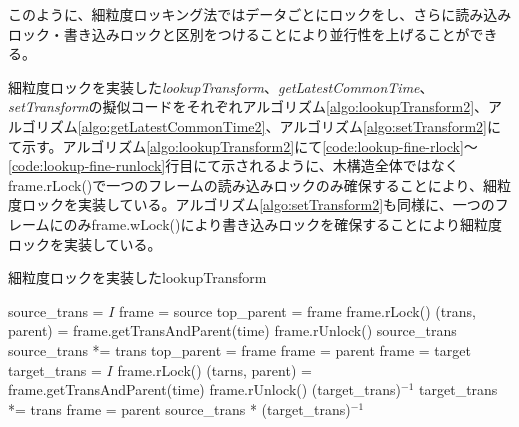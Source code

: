 \documentclass[a4paper]{jreport}	%
\begin{document}
このように、細粒度ロッキング法ではデータごとにロックをし、さらに読み込みロック・書き込みロックと区別をつけることにより並行性を上げることができる。

細粒度ロックを実装した\textit{lookupTransform}、\textit{getLatestCommonTime}、\textit{setTransform}の擬似コードをそれぞれアルゴリズム\ref{algo:lookupTransform2}、アルゴリズム\ref{algo:getLatestCommonTime2}、アルゴリズム\ref{algo:setTransform2}にて示す。アルゴリズム\ref{algo:lookupTransform2}にて\ref{code:lookup-fine-rlock}〜\ref{code:lookup-fine-runlock}行目にて示されるように、木構造全体ではなくframe.rLock()で一つのフレームの読み込みロックのみ確保することにより、細粒度ロックを実装している。アルゴリズム\ref{algo:setTransform2}も同様に、一つのフレームにのみframe.wLock()により書き込みロックを確保することにより細粒度ロックを実装している。

\begin{algorithm}
  \caption{細粒度ロックを実装したlookupTransform}\label{algo:lookupTransform2}
\begin{algorithmic}[1]
	\EndIf
	\State source\_trans = $I$
	\State frame = source
	\State top\_parent = frame
	\State frame.rLock() \label{code:lookup-fine-rlock} 
	\State (trans, parent) = frame.getTransAndParent(time) 
	\State frame.rUnlock() \label{code:lookup-fine-runlock} 
	\State \Return source\_trans
	\EndIf 
	\State source\_trans *= trans
	\State top\_parent = frame
	\State frame = parent
	\EndWhile
	\State frame = target
	\State target\_trans = $I$
	\State frame.rLock()
	\State (tarns, parent) = frame.getTransAndParent(time)
	\State frame.rUnlock()
	\State \Return (target\_trans)$^{-1}$
	\EndIf 
	\State target\_trans *= trans
	\State frame = parent
	\EndWhile
	\State \Return source\_trans * (target\_trans)$^{-1}$
	\EndFunction
\end{algorithmic}
\end{algorithm}
\end{document}
